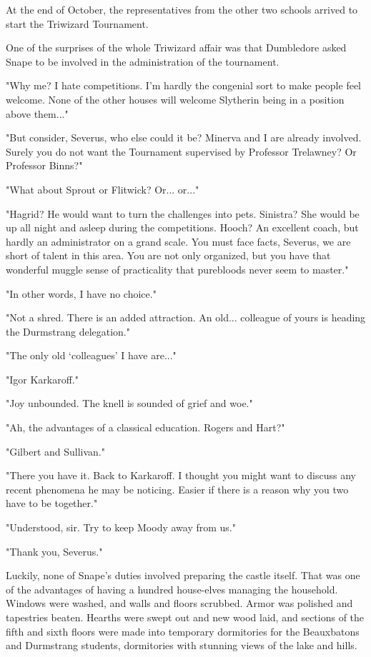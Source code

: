At the end of October, the representatives from the other two schools arrived to start the Triwizard Tournament.

One of the surprises of the whole Triwizard affair was that Dumbledore asked Snape to be involved in the administration of the tournament.

"Why me? I hate competitions. I'm hardly the congenial sort to make people feel welcome. None of the other houses will welcome Slytherin being in a position above them..."

"But consider, Severus, who else could it be? Minerva and I are already involved. Surely you do not want the Tournament supervised by Professor Trelawney? Or Professor Binns?"

"What about Sprout or Flitwick? Or... or..."

"Hagrid? He would want to turn the challenges into pets. Sinistra? She would be up all night and asleep during the competitions. Hooch? An excellent coach, but hardly an administrator on a grand scale. You must face facts, Severus, we are short of talent in this area. You are not only organized, but you have that wonderful muggle sense of practicality that purebloods never seem to master."

"In other words, I have no choice."

"Not a shred. There is an added attraction. An old... colleague of yours is heading the Durmstrang delegation."

"The only old `colleagues' I have are..."

"Igor Karkaroff."

"Joy unbounded. The knell is sounded of grief and woe."

"Ah, the advantages of a classical education. Rogers and Hart?"

"Gilbert and Sullivan."

"There you have it. Back to Karkaroff. I thought you might want to discuss any recent phenomena he may be noticing. Easier if there is a reason why you two have to be together."

"Understood, sir. Try to keep Moody away from us."

"Thank you, Severus."

Luckily, none of Snape's duties involved preparing the castle itself. That was one of the advantages of having a hundred house-elves managing the household. Windows were washed, and walls and floors scrubbed. Armor was polished and tapestries beaten. Hearths were swept out and new wood laid, and sections of the fifth and sixth floors were made into temporary dormitories for the Beauxbatons and Durmstrang students, dormitories with stunning views of the lake and hills.

